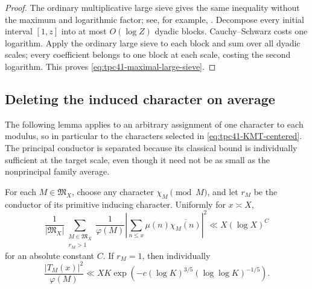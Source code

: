 \begin{proof}
The ordinary multiplicative large sieve gives the same inequality without
the maximum and logarithmic factor; see, for example,
\citet[Chapter~7]{IwaniecKowalski2004}.  Decompose every initial interval
\([1,z]\) into at most \(O(\log Z)\) dyadic blocks.  Cauchy--Schwarz costs
one logarithm.  Apply the ordinary large sieve to each block and sum over
all dyadic scales; every coefficient belongs to one block at each scale,
costing the second logarithm.  This proves
\eqref{eq:tpc41-maximal-large-sieve}.
\end{proof}

\subsection{Deleting the induced character on average}

The following lemma applies to an arbitrary assignment of one character
to each modulus, so in particular to the characters selected in
\eqref{eq:tpc41-KMT-centered}.  The principal conductor is separated
because its classical bound is individually sufficient at the target
scale, even though it need not be as small as the nonprincipal family
average.

\begin{lemma}
\label{lem:tpc41-character-disposal}
For each \(M\in\mathfrak M_X\), choose any character
\(\chi_M\pmod M\), and let \(r_M\) be the conductor of its primitive
inducing character.  Uniformly for \(x\asymp X\),
\begin{equation}
 \boxed{
 \frac1{|\mathfrak M_X|}
 \sum_{\substack{M\in\mathfrak M_X\\r_M>1}}
 \frac1{\varphi(M)}
 \left|\sum_{n\le x}\mu(n)\overline{\chi_M(n)}\right|^2
 \ll X(\log X)^C}
 \label{eq:tpc41-character-average}
\end{equation}
for an absolute constant \(C\).  If \(r_M=1\), then individually
\begin{equation}
 \frac{|T_M(x)|^2}{\varphi(M)}
 \ll XK\exp\left(
  -c(\log K)^{3/5}(\log\log K)^{-1/5}
 \right).
 \label{eq:tpc41-principal-individual}
\end{equation}
\end{lemma}


